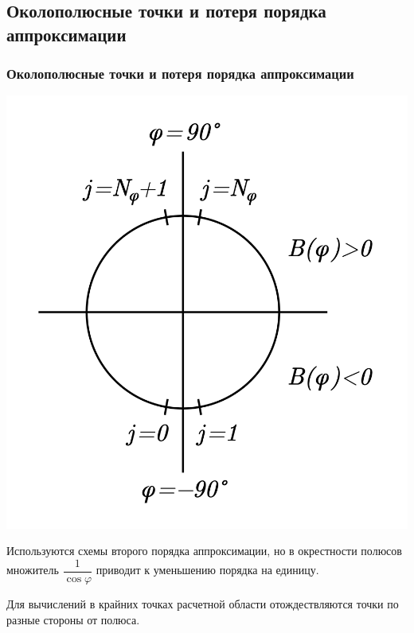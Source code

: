 \documentclass[9pt, apectratio=43,unicode]{beamer}
\begin{document}
\subsection{Околополюсные точки и потеря порядка аппроксимации}
\begin{frame}\frametitle{Околополюсные точки и потеря порядка аппроксимации}



\parbox[b][5cm][t]{40mm}{
\includegraphics[scale = 0.3]{sphere}
}
\hfill
\parbox[b][5cm][t]{70mm}{

\smallskip

Используются схемы второго порядка аппроксимации, но в окрестности полюсов множитель $\dfrac{1}{\cos\varphi}$ приводит к уменьшению порядка на единицу.

\smallskip

Для вычислений в крайних точках расчетной области отождествляются точки по разные стороны от полюса.

}
\end{frame}
\end{document}
